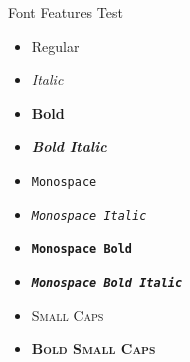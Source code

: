 \documentclass[10pt]{beamer}
\begin{document}
\begin{frame}{Font Features Test}
  \begin{itemize}
    \item Regular
    \item \textit{Italic}
    \item \textbf{Bold}
    \item \textbf{\textit{Bold Italic}}
    \item \texttt{Monospace}
    \item \texttt{\textit{Monospace Italic}}
    \item \texttt{\textbf{Monospace Bold}}
    \item \texttt{\textbf{\textit{Monospace Bold Italic}}}
    \item \textsc{Small Caps}
    \item \textbf{\textsc{Bold Small Caps}}
  \end{itemize}
\end{frame}
\end{document}
